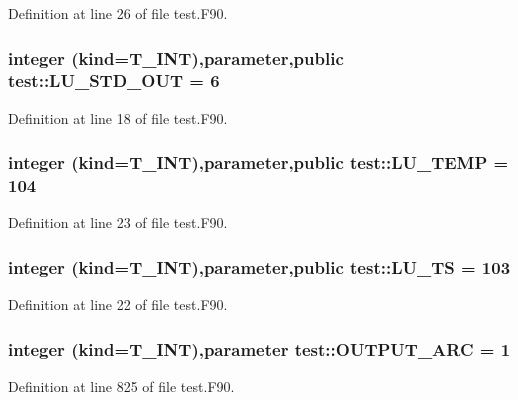 Definition at line 26 of file test.F90.

\hypertarget{namespacetest_ae2c473e7eff311b67b82175c92417cea}{
\subsubsection[{LU\_\-STD\_\-OUT}]{\setlength{\rightskip}{0pt plus 5cm}integer (kind={\bf T\_\-INT}),parameter,public {\bf test::LU\_\-STD\_\-OUT} = 6}}
\label{namespacetest_ae2c473e7eff311b67b82175c92417cea}


Definition at line 18 of file test.F90.

\hypertarget{namespacetest_a3f833495aa697889b22b2de1d999641c}{
\subsubsection[{LU\_\-TEMP}]{\setlength{\rightskip}{0pt plus 5cm}integer (kind={\bf T\_\-INT}),parameter,public {\bf test::LU\_\-TEMP} = 104}}
\label{namespacetest_a3f833495aa697889b22b2de1d999641c}


Definition at line 23 of file test.F90.

\hypertarget{namespacetest_a1a6873182d00ba61beb421697cbe8662}{
\subsubsection[{LU\_\-TS}]{\setlength{\rightskip}{0pt plus 5cm}integer (kind={\bf T\_\-INT}),parameter,public {\bf test::LU\_\-TS} = 103}}
\label{namespacetest_a1a6873182d00ba61beb421697cbe8662}


Definition at line 22 of file test.F90.

\hypertarget{namespacetest_ada8330c2643deca7d4e85ce248e3e941}{
\subsubsection[{OUTPUT\_\-ARC}]{\setlength{\rightskip}{0pt plus 5cm}integer (kind={\bf T\_\-INT}),parameter {\bf test::OUTPUT\_\-ARC} = 1}}
\label{namespacetest_ada8330c2643deca7d4e85ce248e3e941}


Definition at line 825 of file test.F90.

